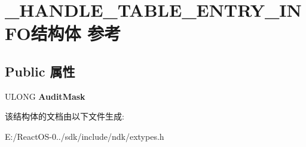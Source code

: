 \hypertarget{struct___h_a_n_d_l_e___t_a_b_l_e___e_n_t_r_y___i_n_f_o}{}\section{\+\_\+\+H\+A\+N\+D\+L\+E\+\_\+\+T\+A\+B\+L\+E\+\_\+\+E\+N\+T\+R\+Y\+\_\+\+I\+N\+F\+O结构体 参考}
\label{struct___h_a_n_d_l_e___t_a_b_l_e___e_n_t_r_y___i_n_f_o}
\subsection*{Public 属性}
\begin{DoxyCompactItemize}
\item 
\mbox{\label{struct___h_a_n_d_l_e___t_a_b_l_e___e_n_t_r_y___i_n_f_o_a79ba74c7bd2e2e046bc505fb3f73ff9b}} 
U\+L\+O\+NG {\bfseries Audit\+Mask}
\end{DoxyCompactItemize}


该结构体的文档由以下文件生成\+:\begin{DoxyCompactItemize}
\item 
E\+:/\+React\+O\+S-\/0../sdk/include/ndk/extypes.\+h\end{DoxyCompactItemize}
